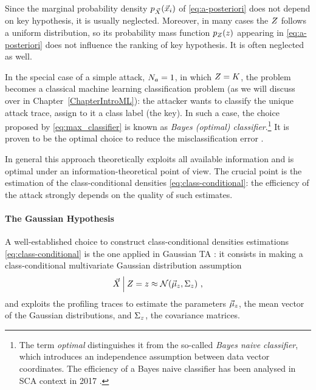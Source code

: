 \begin{remark}Since the marginal probability density $p_{\vec{X}}(\vec{x}_i)$ of \eqref{eq:a-posteriori} does not depend on key hypothesis, it is usually neglected. Moreover, in many cases the $Z$ follows a uniform distribution, so its probability mass function $p_{Z}(z)$ appearing in \eqref{eq:a-posteriori}  does not influence the ranking of key hypothesis. It is often neglected as well. 
\end{remark}

\begin{remark}
In the special case of a simple attack, \ie $N_a = 1$, in which $Z = K$, the problem becomes a classical machine learning classification problem (as we will discuss over in Chapter~\ref{ChapterIntroML}): the attacker wants to classify the unique attack trace, \ie assign to it a class label (the key). In such a case, the choice proposed by \eqref{eq:max_classifier} is known as \emph{Bayes (optimal) classifier}.\footnote{The term \emph{optimal} distinguishes it from the so-called \emph{Bayes naive classifier}, which introduces an independence assumption between data vector coordinates. The efficiency of a Bayes naive classifier has been analysed in SCA context in 2017 \cite{picek2017template}.} It is proven to be the optimal choice to reduce the misclassification error \cite{christopher2006pattern}.
\end{remark}

In general this approach theoretically exploits all available information and is optimal under an information-theoretical point of view. The crucial point is the estimation of the class-conditional densities \eqref{eq:class-conditional}: the efficiency of the attack strongly depends on the quality of such estimates. 

\paragraph{The Gaussian Hypothesis} A well-established choice to construct class-conditional densities estimations \ref{eq:class-conditional} is the one applied in Gaussian TA \cite{Chari2003}: it consists in making a class-conditional multivariate Gaussian distribution assumption
\begin{equation}\label{eq:gaussian_assumption}
\vec{X}\:\Big\vert\: Z =z \approx \mathcal{N}(\vec{\mu}_z, \Sigma_z)\mbox{ ,}
\end{equation} 
and exploits the profiling traces to estimate the  parameters $\vec{\mu}_z$, \ie the mean vector of the Gaussian distributions, and $ \Sigma_z$, \ie the covariance matrices. \\

